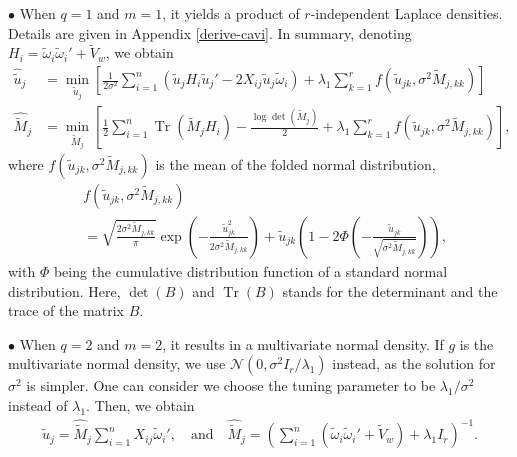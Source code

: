 \documentclass[pdftex, noinfoline, letter]{imsart}
\DeclareMathOperator{\Tr}{Tr}
\theoremstyle{plain}
\begin{document}
$\bullet$ When $q = 1$ and $m = 1$, it yields a product of $r$-independent Laplace densities. Details are given in Appendix \ref{derive-cavi}. 
In summary, denoting $H_i = \widetilde  \omega_i \widetilde  \omega_i' + \widetilde  V_w$, we obtain 
\begin{align}
	\label{eqn:cavi-u}
	\widehat  {\widetilde  u}_j & = \min_{\widetilde  u_j}
	\left[
	\frac{1}{2\sigma^2} \sum_{i=1}^n
	\left(\widetilde  u_j H_i \widetilde  u_j' - 2 X_{ij} \widetilde  u_j \widetilde  \omega_i \right)
	+ \lambda_1 \sum_{k=1}^r f(\widetilde  u_{jk}, \sigma^2 \widetilde  M_{j,kk})
	\right] \\
	\label{eqn:cavi-Xi}
	\widehat  {\widetilde M}_j
	& = \min_{\widetilde  M_j}
	\left[\frac{1}{2} 
	\sum_{i=1}^n \Tr(\widetilde  M_j H_i)
	- \frac{\log \det(\widetilde  M_j) }{2}
	+ \lambda_1 \sum_{k=1}^r f(\widetilde  u_{jk},\sigma^2  \widetilde  M_{j, kk})
	\right],
\end{align}
where 
$f(\widetilde  u_{jk},\sigma^2  \widetilde  M_{j,kk})$ is the mean of the folded normal distribution, 
\begin{align*}
	&f(\widetilde  u_{jk},\sigma^2  \widetilde  M_{j,kk})\\
	&= \sqrt{\frac{2\sigma^2 \widetilde  M_{j, kk}}{\pi}} \exp\left(-\frac{\widetilde  u_{jk}^2}{2\sigma^2 \widetilde  M_{j,kk}}\right)
	+ \widetilde  u_{jk} \left(1-2\Phi\left(- \frac{\widetilde  u_{jk}}{\sqrt{\sigma^2 \widetilde  M_{j,kk}}} \right)\right),
\end{align*}
with $\Phi$ being the cumulative distribution function of a standard normal distribution. Here, $\det(B)$ and $\Tr(B)$ stands for the determinant and the trace of the matrix $B$. 

$\bullet$ When $q = 2$ and $m = 2$, it results in a multivariate normal density.
If $g$ is the multivariate normal density, we use $\mathcal{N}(0, \sigma^2I_r/\lambda_1 )$ instead, as the solution for $\sigma^2$ is simpler. One can consider we choose the tuning parameter to be $\lambda_1/\sigma^2$ instead of $\lambda_1$. 
Then, we obtain
\begin{align}
     \widehat  {\widetilde  u}_j  = 
    \widehat  {\widetilde M}_j
        \sum_{i=1}^n X_{ij} \widetilde  \omega_i',
\quad\text{and}\quad
\widehat  {\widetilde  M}_j = 
    \left(
        \sum_{i=1}^n 
        \left(
            \widetilde  \omega_i \widetilde  \omega_i' + \widetilde  V_w
        \right) + \lambda_1 I_r
    \right)^{-1}.\label{eqn:cavi-u-mvn}
\end{align}
\smallskip
\end{document}
